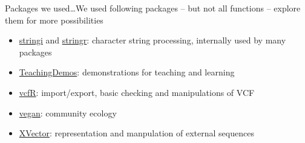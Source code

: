 \documentclass[compress, ucs, xelatex, 11pt, xcolor=svgnames,
  hyperref={
    bookmarks=true,
    unicode=true,
    colorlinks=true,
    pdftitle={Molecular data in R},
    plainpages=false,
    pdfauthor={Vojtech Zeisek},
    pdfsubject={Course about phylogeny and evolution in R},
    pdfcreator={XeLaTeX},
    pdfkeywords={R, evolution, phylogeny, molecular data},
    linkcolor=Tomato,
    anchorcolor=SaddleBrown,
    citecolor=Goldenrod,
    filecolor=DarkMagenta,
    menucolor=Sienna,
    urlcolor=DarkTurquoise,
    pdftex},
  url={hyphens, lowtilde} %
  ]{beamer}
\begin{document}
\begin{frame}[allowframebreaks]{Packages we used\ldots}{We used following packages -- but not all functions -- explore them for more possibilities}
\begin{itemize}
    \item \href{https://CRAN.R-project.org/package=stringi}{stringi} and \href{https://CRAN.R-project.org/package=stringr}{stringr}: character string processing, internally used by many packages 
    \item \href{https://CRAN.R-project.org/package=TeachingDemos}{TeachingDemos}: demonstrations for teaching and learning
    \item \href{https://CRAN.R-project.org/package=vcfR}{vcfR}: import/export, basic checking and manipulations of VCF
    \item \href{https://CRAN.R-project.org/package=vegan}{vegan}: community ecology
    \item \href{https://www.bioconductor.org/packages/3.4/bioc/html/XVector.html}{XVector}: representation and manpulation of external sequences
  \end{itemize}
\end{frame}
\end{document}
